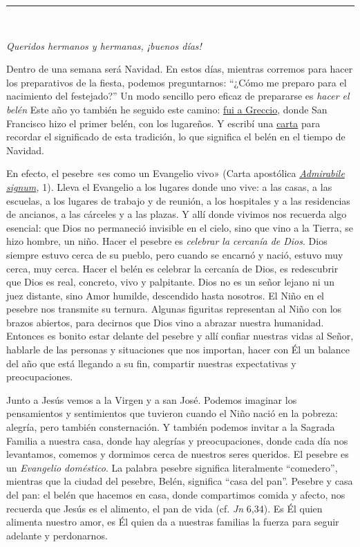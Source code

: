 \begin{center}\rule{0.5\linewidth}{\linethickness}\end{center}

~

\emph{Queridos hermanos y hermanas, ¡buenos días!}

Dentro de una semana será Navidad. En estos días, mientras corremos para
hacer los preparativos de la fiesta, podemos preguntarnos: ``¿Cómo me
preparo para el nacimiento del festejado?'' Un modo sencillo pero eficaz
de prepararse es \emph{hacer el belén} Este año yo también he seguido
este camino:
\href{http://w2.vatican.va/content/francesco/es/events/event.dir.html/content/vaticanevents/es/2019/12/1/greccio-presepe.html}{fui
	a Greccio}, donde San Francisco hizo el primer belén, con los lugareños.
Y escribí una
\href{http://w2.vatican.va/content/francesco/es/apost_letters/documents/papa-francesco-lettera-ap_20191201_admirabile-signum.html}{carta}
para recordar el significado de esta tradición, lo que significa el
belén en el tiempo de Navidad.

En efecto, el pesebre «es como un Evangelio vivo» (Carta apostólica
\emph{\href{http://w2.vatican.va/content/francesco/es/apost_letters/documents/papa-francesco-lettera-ap_20191201_admirabile-signum.html}{Admirabile
		signum},} 1). Lleva el Evangelio a los lugares donde uno vive: a las
casas, a las escuelas, a los lugares de trabajo y de reunión, a los
hospitales y a las residencias de ancianos, a las cárceles y a las
plazas. Y allí donde vivimos nos recuerda algo esencial: que Dios no
permaneció invisible en el cielo, sino que vino a la Tierra, se hizo
hombre, un niño. Hacer el pesebre es \emph{celebrar la cercanía de
	Dios}. Dios siempre estuvo cerca de su pueblo, pero cuando se encarnó y
nació, estuvo muy cerca, muy cerca. Hacer el belén es celebrar la
cercanía de Dios, es redescubrir que Dios es real, concreto, vivo y
palpitante. Dios no es un señor lejano ni un juez distante, sino Amor
humilde, descendido hasta nosotros. El Niño en el pesebre nos transmite
su ternura. Algunas figuritas representan al Niño con los brazos
abiertos, para decirnos que Dios vino a abrazar nuestra humanidad.
Entonces es bonito estar delante del pesebre y allí confiar nuestras
vidas al Señor, hablarle de las personas y situaciones que nos importan,
hacer con Él un balance del año que está llegando a su fin, compartir
nuestras expectativas y preocupaciones.

Junto a Jesús vemos a la Virgen y a san José. Podemos imaginar los
pensamientos y sentimientos que tuvieron cuando el Niño nació en la
pobreza: alegría, pero también consternación. Y también podemos invitar
a la Sagrada Familia a nuestra casa, donde hay alegrías y
preocupaciones, donde cada día nos levantamos, comemos y dormimos cerca
de nuestros seres queridos. El pesebre es un \emph{Evangelio doméstico}.
La palabra pesebre significa literalmente ``comedero'', mientras que la
ciudad del pesebre, Belén, significa ``casa del pan''. Pesebre y casa
del pan: el belén que hacemos en casa, donde compartimos comida y
afecto, nos recuerda que Jesús es el alimento, el pan de vida (cf.
\emph{Jn} 6,34). Es Él quien alimenta nuestro amor, es Él quien da a
nuestras familias la fuerza para seguir adelante y perdonarnos.

